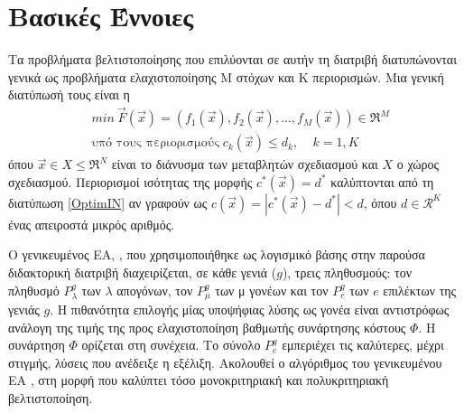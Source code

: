 \section{Βασικές Έννοιες}
Τα προβλήματα βελτιστοποίησης που επιλύονται σε αυτήν τη διατριβή διατυπώνονται γενικά ως προβλήματα ελαχιστοποίησης Μ στόχων και Κ περιορισμών. Μια γενική διατύπωσή τους είναι η  
\label{OPt_def}
\begin{align} 
   &min ~ \vec{F}(\vec{x})=(f_1(\vec{x}),f_2(\vec{x}),...,f_M(\vec{x}))\in \Re^{M} \nonumber \\
   &\mbox{υπό τους περιορισμούς} ~ c_k(\vec{x})\leq d_k, ~~~~~ k =1,K
\label{OptimIN}
\end{align}
όπου $\vec{x}\in X \!\leq\! \Re^{N}$ είναι το διάνυσμα των μεταβλητών σχεδιασμού και $X$ ο χώρος σχεδιασμού. Περιορισμοί ισότητας της μορφής $c^*\left( \vec{x} \right)=d^*$ καλύπτονται από τη διατύπωση \ref{OptimIN} αν γραφούν ως $c\left( \vec{x} \right)= \left|c^*\left( \vec{x} \right) -d^*\right|\!<\!d$, όπου $d\in\mathcal{R}^K$ ένας απειροστά μικρός αριθμός. 



Ο γενικευμένος EA, \cite{phd_Giotis}, που χρησιμοποιήθηκε ως λογισμικό βάσης στην παρούσα διδακτορική διατριβή διαχειρίζεται, σε κάθε γενιά ($g$), τρεις πληθυσμούς: τον πληθυσμό $P_{\lambda}^g$ των $\lambda$ απογόνων, τον $P_{\mu}^g$ των μ γονέων και τον $P_{e}^g$ των $e$ επιλέκτων της γενιάς $g$. Η πιθανότητα επιλογής μίας υποψήφιας λύσης ως γονέα είναι αντιστρόφως ανάλογη της τιμής της προς ελαχιστοποίηση βαθμωτής συνάρτησης κόστους $\Phi$. Η συνάρτηση $\Phi$ ορίζεται στη συνέχεια. Το σύνολο $P_{e}^g$ εμπεριέχει τις καλύτερες, μέχρι στιγμής, λύσεις που ανέδειξε η εξέλιξη.  Ακολουθεί ο αλγόριθμος του γενικευμένου ΕΑ \cite{phd_Giotis}, στη μορφή που καλύπτει τόσο μονοκριτηριακή και πολυκριτηριακή βελτιστοποίηση.  

